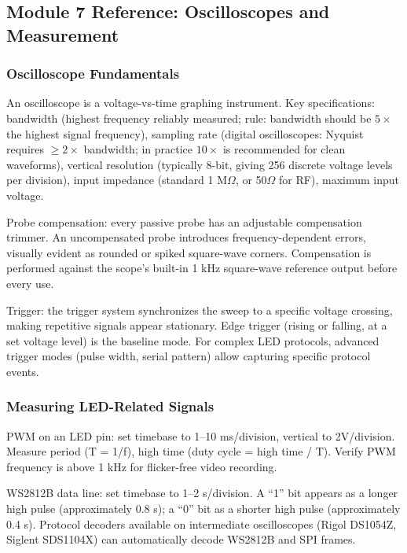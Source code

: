 \documentclass[11pt,letterpaper]{article}
\begin{document}
\subsection{Module 7 Reference: Oscilloscopes and Measurement}

\subsubsection{Oscilloscope Fundamentals}

An oscilloscope is a voltage-vs-time graphing instrument. Key specifications: bandwidth (highest frequency reliably measured; rule: bandwidth should be $5\times$ the highest signal frequency), sampling rate (digital oscilloscopes: Nyquist requires $\geq 2\times$ bandwidth; in practice $10\times$ is recommended for clean waveforms), vertical resolution (typically 8-bit, giving 256 discrete voltage levels per division), input impedance (standard 1 M$\Omega$, or 50$\Omega$ for RF), maximum input voltage.

Probe compensation: every passive probe has an adjustable compensation trimmer. An uncompensated probe introduces frequency-dependent errors, visually evident as rounded or spiked square-wave corners. Compensation is performed against the scope's built-in 1 kHz square-wave reference output before every use.

Trigger: the trigger system synchronizes the sweep to a specific voltage crossing, making repetitive signals appear stationary. Edge trigger (rising or falling, at a set voltage level) is the baseline mode. For complex LED protocols, advanced trigger modes (pulse width, serial pattern) allow capturing specific protocol events.

\subsubsection{Measuring LED-Related Signals}

PWM on an LED pin: set timebase to 1--10 ms/division, vertical to 2V/division. Measure period (T = 1/f), high time (duty cycle = high time / T). Verify PWM frequency is above 1 kHz for flicker-free video recording.

WS2812B data line: set timebase to 1--2 \textmu s/division. A ``1'' bit appears as a longer high pulse (approximately 0.8 \textmu s); a ``0'' bit as a shorter high pulse (approximately 0.4 \textmu s). Protocol decoders available on intermediate oscilloscopes (Rigol DS1054Z, Siglent SDS1104X) can automatically decode WS2812B and SPI frames.
\end{document}
